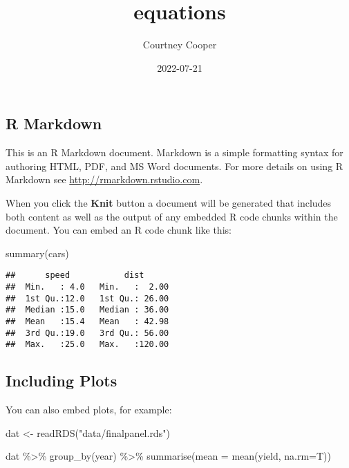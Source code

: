 \documentclass[
]{article}
\title{equations}
\author{Courtney Cooper}
\date{2022-07-21}
\newenvironment{Shaded}{\begin{snugshade}}{\end{snugshade}}
\newcommand{\AttributeTok}[1]{\textcolor[rgb]{0.77,0.63,0.00}{#1}}
\newcommand{\FunctionTok}[1]{\textcolor[rgb]{0.00,0.00,0.00}{#1}}
\newcommand{\NormalTok}[1]{#1}
\newcommand{\OtherTok}[1]{\textcolor[rgb]{0.56,0.35,0.01}{#1}}
\newcommand{\SpecialCharTok}[1]{\textcolor[rgb]{0.00,0.00,0.00}{#1}}
\newcommand{\StringTok}[1]{\textcolor[rgb]{0.31,0.60,0.02}{#1}}
\begin{document}
\maketitle

\hypertarget{r-markdown}{%
\subsection{R Markdown}\label{r-markdown}}

This is an R Markdown document. Markdown is a simple formatting syntax
for authoring HTML, PDF, and MS Word documents. For more details on
using R Markdown see \url{http://rmarkdown.rstudio.com}.

When you click the \textbf{Knit} button a document will be generated
that includes both content as well as the output of any embedded R code
chunks within the document. You can embed an R code chunk like this:

\begin{Shaded}
\begin{Highlighting}[]
\FunctionTok{summary}\NormalTok{(cars)}
\end{Highlighting}
\end{Shaded}

\begin{verbatim}
##      speed           dist       
##  Min.   : 4.0   Min.   :  2.00  
##  1st Qu.:12.0   1st Qu.: 26.00  
##  Median :15.0   Median : 36.00  
##  Mean   :15.4   Mean   : 42.98  
##  3rd Qu.:19.0   3rd Qu.: 56.00  
##  Max.   :25.0   Max.   :120.00
\end{verbatim}

\hypertarget{including-plots}{%
\subsection{Including Plots}\label{including-plots}}

You can also embed plots, for example:

\begin{Shaded}
\begin{Highlighting}[]
\NormalTok{dat }\OtherTok{\textless{}{-}} \FunctionTok{readRDS}\NormalTok{(}\StringTok{"data/finalpanel.rds"}\NormalTok{)}

\NormalTok{dat }\SpecialCharTok{\%\textgreater{}\%}
  \FunctionTok{group\_by}\NormalTok{(year) }\SpecialCharTok{\%\textgreater{}\%}
  \FunctionTok{summarise}\NormalTok{(}\AttributeTok{mean =} \FunctionTok{mean}\NormalTok{(yield, }\AttributeTok{na.rm=}\NormalTok{T))}
\end{Highlighting}
\end{Shaded}
\end{document}
